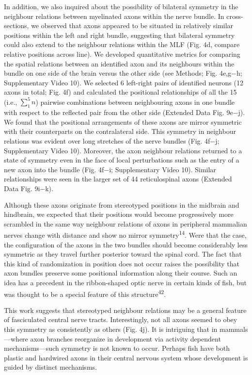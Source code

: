 \documentclass{article}
\begin{document}
In addition, we also inquired about the possibility of bilateral symmetry in the neighbour relations between myelinated axons within the nerve bundle. In cross-sections, we observed that axons appeared to be situated in relatively similar positions within the left and right bundle, suggesting that bilateral symmetry could also extend to the neighbour relations within the MLF (Fig. 4d, compare relative positions across line). We developed quantitative metrics for comparing the spatial relations between an identified axon and its neighbours within the bundle on one side of the brain versus the other side (see Methods; Fig. 4e,g−h; Supplementary Video 10). We selected 6 left-right pairs of identified neurons (12 axons in total; Fig. 4f) and calculated the positional relationships of all the 15 (i.e., $\sum_{1}^{5} n$) pairwise combinations between neighbouring axons in one bundle with respect to the reflected pair from the other side (Extended Data Fig. 9e−j). We found that the positional arrangements of these axons are mirror symmetric with their counterparts on the contralateral side. This symmetry in neighbour relations was evident over long stretches of the nerve bundles (Fig. 4f−j; Supplementary Video 10). Moreover, the axon neighbour relations returned to a state of symmetry even in the face of local perturbations such as the entry of a new axon into the bundle (Fig. 4f−i; Supplementary Video 10). Similar relationships were seen in the larger set of 44 reticulospinal axons (Extended Data Fig. 9i−k).


Although these axons originate from stereotyped positions in the midbrain and hindbrain, we expected that their positions would become progressively more scrambled in the same way neighbour relations of axons in peripheral mammalian nerves change with distance and show no mirror symmetry\textsuperscript{14}. Were that the case, the configuration of the axons in the two bundles should become considerably less symmetric as they travel further posterior toward the spinal cord. The fact that this kind of randomization in position does not occur raises the possibility that axon bundles preserve some positional information along their course. Such an idea has a precedent in the ribbon-shaped optic nerve in certain kinds of fish, but was thought to be a special feature of this structure\textsuperscript{42}.

This work suggests that stereotyped neighbour relations may be a general feature of fasciculated central nerve tracts. Interestingly, not all axons seemed to obey this symmetry as consistently as others (Fig. 4j). It is intriguing that in mammals—where axon branches reorganize in development via activity dependent mechanisms—such symmetry is not known to occur. Perhaps fish have both plastic and hardwired axons in their central nervous system whose development is guided by distinct mechanisms.
\end{document}
